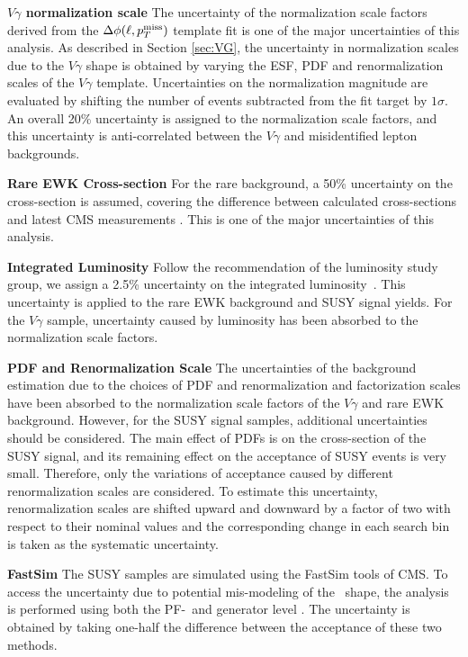 \documentclass[thesis.tex]{subfiles}
\renewcommand\_{\textunderscore\allowbreak}
\begin{document}
\noindent \textbf{$V\gamma$ normalization scale}
\quad The uncertainty of the normalization scale factors derived from the $\Delta\phi(\ell, p_T^\textrm{miss})$ template fit is one of the major uncertainties of this analysis. 
As described in Section \ref{sec:VG}, the uncertainty in normalization scales due to the $V\gamma$ shape is obtained by varying the ESF, PDF and renormalization scales of the $V\gamma$ template. 
Uncertainties on the normalization magnitude are evaluated by shifting the number of events subtracted from the fit target by $1\sigma$. 
An overall 20\% uncertainty is assigned to the normalization scale factors, and this uncertainty is anti-correlated between the $V\gamma$ and misidentified lepton backgrounds. 

\noindent \textbf{Rare EWK Cross-section}
\quad For the rare background, a 50\% uncertainty on the cross-section is assumed, covering the difference between calculated cross-sections and latest CMS measurements \cite{CMS:ttgxs,CMS:ttxs}. 
This is one of the major uncertainties of this analysis. 

\noindent \textbf{Integrated Luminosity}
\quad Follow the recommendation of the luminosity study group, we assign a 2.5\% uncertainty on the integrated luminosity~\cite{CMS-PAS-LUM-17-001}. 
This uncertainty is applied to the rare EWK background and SUSY signal yields. 
For the $V\gamma$ sample, uncertainty caused by luminosity has been absorbed to the normalization scale factors.

\noindent \textbf{PDF and Renormalization Scale} 
\quad The uncertainties of the background estimation due to the choices of PDF and renormalization and factorization scales have been absorbed to the normalization scale factors of the $V\gamma$ and rare EWK background.
However, for the SUSY signal samples, additional uncertainties should be considered. 
The main effect of PDFs is on the cross-section of the SUSY signal, and its remaining effect on the acceptance of SUSY events is very small. 
Therefore, only the variations of acceptance caused by different renormalization scales are considered. 
To estimate this uncertainty, renormalization scales are shifted upward and downward by a factor of two with respect to their nominal values and the corresponding change in each search bin is taken as the systematic uncertainty. 

\noindent \textbf{FastSim \MET}
\quad The SUSY samples are simulated using the FastSim tools of CMS. 
To access the uncertainty due to potential mis-modeling of the \MET~shape, the analysis is performed using both the PF-\MET~and generator level \MET. 
The uncertainty is obtained by taking one-half the difference between the acceptance of these two methods.  
\end{document}
